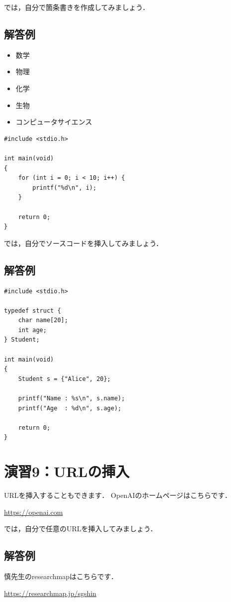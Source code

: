 \documentclass[a4paper,twocolumn]{jsarticle}
\begin{document}
では，自分で箇条書きを作成してみましょう．

\subsection*{解答例}
\begin{itemize}
    \item 数学
    \item 物理
    \item 化学
    \item 生物
    \item コンピュータサイエンス
\end{itemize}

\begin{lstlisting}
#include <stdio.h>

int main(void)
{
    for (int i = 0; i < 10; i++) {
        printf("%d\n", i);
    }

    return 0;
}
\end{lstlisting}

では，自分でソースコードを挿入してみましょう．

\subsection*{解答例}
\begin{lstlisting}
#include <stdio.h>

typedef struct {
    char name[20];
    int age;
} Student;

int main(void)
{
    Student s = {"Alice", 20};

    printf("Name : %s\n", s.name);
    printf("Age  : %d\n", s.age);

    return 0;
}
\end{lstlisting}

\section*{演習9：URLの挿入}
URLを挿入することもできます．
OpenAIのホームページはこちらです．

\url{https://openai.com}

では，自分で任意のURLを挿入してみましょう．

\subsection*{解答例}
慎先生のresearchmapはこちらです．

\url{https://researchmap.jp/sgshin}
\end{document}

